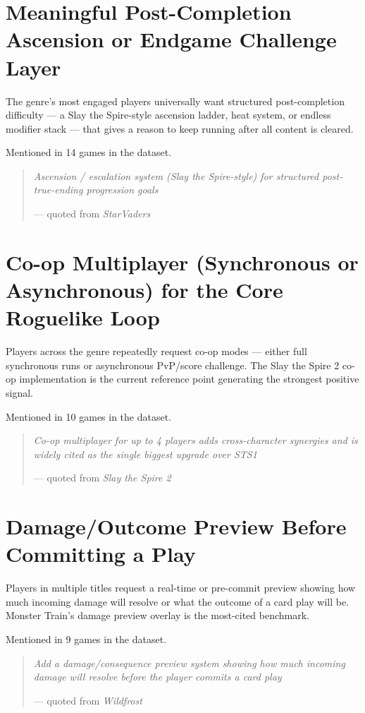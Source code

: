 \documentclass[11pt,letterpaper]{report}
\begin{document}
\section*{Meaningful Post-Completion Ascension or Endgame Challenge Layer}
\label{sec:orge890ba4}
The genre's most engaged players universally want structured post-completion difficulty — a Slay the Spire-style ascension ladder, heat system, or endless modifier stack — that gives a reason to keep running after all content is cleared.

Mentioned in 14 games in the dataset.

\begin{quote}
\emph{Ascension / escalation system (Slay the Spire-style) for structured post-true-ending progression goals}

— quoted from \emph{StarVaders}
\end{quote}
\section*{Co-op Multiplayer (Synchronous or Asynchronous) for the Core Roguelike Loop}
\label{sec:org38e1b39}
Players across the genre repeatedly request co-op modes — either full synchronous runs or asynchronous PvP/score challenge. The Slay the Spire 2 co-op implementation is the current reference point generating the strongest positive signal.

Mentioned in 10 games in the dataset.

\begin{quote}
\emph{Co-op multiplayer for up to 4 players adds cross-character synergies and is widely cited as the single biggest upgrade over STS1}

— quoted from \emph{Slay the Spire 2}
\end{quote}
\section*{Damage/Outcome Preview Before Committing a Play}
\label{sec:org410814a}
Players in multiple titles request a real-time or pre-commit preview showing how much incoming damage will resolve or what the outcome of a card play will be. Monster Train's damage preview overlay is the most-cited benchmark.

Mentioned in 9 games in the dataset.

\begin{quote}
\emph{Add a damage/consequence preview system showing how much incoming damage will resolve before the player commits a card play}

— quoted from \emph{Wildfrost}
\end{quote}
\end{document}
